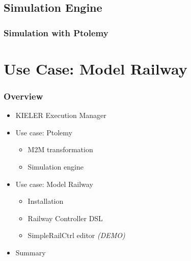 \documentclass[notes,handout]{beamer}
\newcommand{\GRAY}[1]{\textcolor[rgb]{0.60,0.60,0.60}{#1}}
\begin{document}
\subsection[Simulation Engine]{Simulation Engine}
\begin{frame}
  \frametitle{Simulation with Ptolemy}
  \end{frame}



\section*{Use Case: Model Railway}
\begin{frame}
  \frametitle{Overview}
    \begin{itemize}
	      \item \GRAY{KIELER Execution Manager}
	      \item \GRAY{Use case: Ptolemy }
        \begin{itemize}
       	       \item \GRAY{M2M transformation}
       	       \item \GRAY{Simulation engine}
        \end{itemize}
	      \item Use case: Model Railway
        \begin{itemize}
	            \item Installation
	            \item Railway Controller DSL
	            \item SimpleRailCtrl editor \emph{(DEMO)}
        \end{itemize}
	      \item \GRAY{Summary}
    \end{itemize}
\end{frame}
\end{document}
